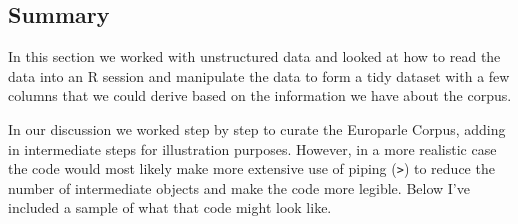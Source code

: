 \documentclass[
  letterpaper,
]{latex/krantz}
\begin{document}
\hypertarget{summary-6}{%
\subsection{Summary}\label{summary-6}}

In this section we worked with unstructured data and looked at how to
read the data into an R session and manipulate the data to form a tidy
dataset with a few columns that we could derive based on the information
we have about the corpus.

In our discussion we worked step by step to curate the Europarle Corpus,
adding in intermediate steps for illustration purposes. However, in a
more realistic case the code would most likely make more extensive use
of piping (\texttt{\textbar{}\textgreater{}}) to reduce the number of
intermediate objects and make the code more legible. Below I've included
a sample of what that code might look like.
\end{document}

